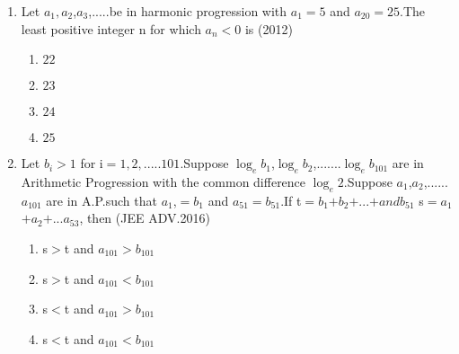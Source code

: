 \documentclass[journal,12pt,twocolumn]{IEEEtran}
\theoremstyle{remark}
\begin{document}
\begin{enumerate} [start=5]
\begin{enumerate}
        \item $\frac{n\brak{4n^2-1}c^2}{3}$
        \item $\frac{n\brak{4n^2+1}c^2}{6}$
    \end{enumerate}
    \item Let $a_{1}$$,a_{2}$,$a_{3}$,.....be in harmonic progression with $a_{1}=5$ and $a_{20}=25$.The least positive integer n for which $a_{n}$$<$$0$ is
    \hfill(2012)
    \begin{enumerate}
        \item $22$
        \item $23$
        \item $24$
        \item $25$
    \end{enumerate}
    \item Let $b_{i}$$>$$1$ for i$=$$1,2,.....101$.Suppose $\log_eb_{1}$,$\log_eb_{2}$,.......$\log_eb_{101}$ are in Arithmetic Progression  with the common difference $\log_e2$.Suppose $a_{1}$,$a_{2}$,......$a_{101}$ are in A.P.such that $a_{1}$,$=$$b_{1}$ and $a_{51}$$=$$b_{51}$.If t$=$$b_{1}$$+$$b_{2}$$+$...$+$$ and b_{51}$ s$=$$a_{1}$$+$$a_{2}$$+$...$a_{53}$, then 
    \hfill(JEE ADV.2016)
    \begin{enumerate}
        \item s$>$t and $a_{101}$$>$$b_{101}$
        \item s$>$t and $a_{101}$$<$$b_{101}$
        \item s$<$t and $a_{101}$$>$$b_{101}$
        \item s$<$t and $a_{101}$$<$$b_{101}$
    \end{enumerate}
    
\end{enumerate}




    
\end{document}
